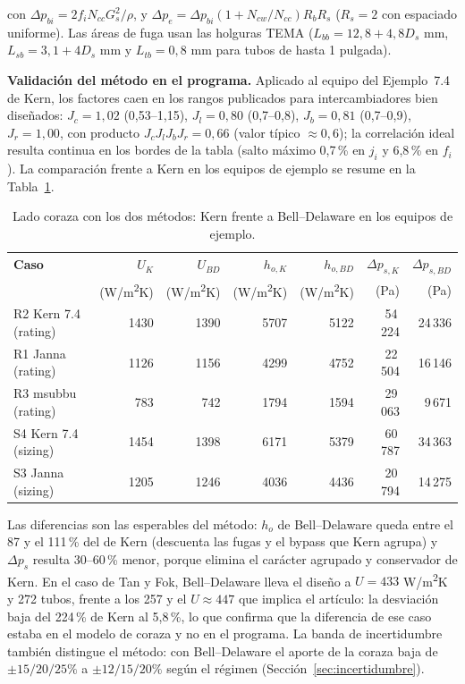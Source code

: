 \documentclass[11pt,a4paper]{article}
\begin{document}
con $\Delta p_{bi} = 2 f_i N_{cc} G_s^2/\rho$, 
y $\Delta p_e = \Delta p_{bi}(1+N_{cw}/N_{cc})R_bR_s$ 
($R_s = 2$ con espaciado uniforme). Las \'areas de fuga usan las 
holguras TEMA ($L_{bb} = 12{,}8+4{,}8D_s$ mm, $L_{sb} = 3{,}1+4D_s$ mm y 
$L_{tb} = 0{,}8$ mm para tubos de hasta 1 pulgada).

\textbf{Validaci\'on del m\'etodo en el programa.} Aplicado al equipo del 
Ejemplo~7.4 de Kern, los factores caen en los rangos publicados para 
intercambiadores bien dise\~nados: $J_c = 1{,}02$ (0,53--1,15), 
$J_l = 0{,}80$ (0,7--0,8), $J_b = 0{,}81$ (0,7--0,9), $J_r = 1{,}00$, con 
producto $J_cJ_lJ_bJ_r = 0{,}66$ (valor t\'ipico $\approx 0{,}6$); la 
correlaci\'on ideal resulta continua en los bordes de la tabla (salto 
m\'aximo 0,7\,\% en $j_i$ y 6,8\,\% en $f_i$). La comparaci\'on frente a Kern en los 
equipos de ejemplo se resume en la Tabla~\ref{tab:bd}.

\begin{table}[H]
\centering
\caption{Lado coraza con los dos m\'etodos: Kern frente a Bell--Delaware 
en los equipos de ejemplo.}
\label{tab:bd}
{\small
\begin{tabular}{@{}lrrrrrr@{}}
\toprule
\textbf{Caso} & $U_K$ & $U_{BD}$ & $h_{o,K}$ & $h_{o,BD}$ & $\Delta p_{s,K}$ & $\Delta p_{s,BD}$ \\
 & (W/m\textsuperscript{2}K) & (W/m\textsuperscript{2}K) & (W/m\textsuperscript{2}K) & (W/m\textsuperscript{2}K) & (Pa) & (Pa) \\
\midrule
R2 Kern 7.4 (rating) & 1430 & 1390 & 5707 & 5122 & 54\,224 & 24\,336 \\
R1 Janna (rating)    & 1126 & 1156 & 4299 & 4752 & 22\,504 & 16\,146 \\
R3 msubbu (rating)   & 783  & 742  & 1794 & 1594 & 29\,063 & 9\,671 \\
S4 Kern 7.4 (sizing) & 1454 & 1398 & 6171 & 5379 & 60\,787 & 34\,363 \\
S3 Janna (sizing)    & 1205 & 1246 & 4036 & 4436 & 20\,794 & 14\,275 \\
\bottomrule
\end{tabular}}
\end{table}

Las diferencias son las esperables del m\'etodo: $h_o$ de Bell--Delaware 
queda entre el 87 y el 111\,\% del de Kern (descuenta las fugas y el 
bypass que Kern agrupa) y $\Delta p_s$ resulta 30--60\,\% menor, porque 
elimina el car\'acter agrupado y conservador de Kern. En el caso de Tan y 
Fok, Bell--Delaware lleva el dise\~no a $U = 433$ W/m\textsuperscript{2}K 
y 272 tubos, frente a los 257 y el $U \approx 447$ que implica el 
art\'iculo: la desviaci\'on baja del 224\,\% de Kern al 
5,8\,\%, lo que confirma que la diferencia de ese caso estaba en 
el modelo de coraza y no en el programa. La banda de incertidumbre 
tambi\'en distingue el m\'etodo: con Bell--Delaware el aporte de la 
coraza baja de $\pm 15/20/25\%$ a $\pm 12/15/20\%$ seg\'un el 
r\'egimen (Secci\'on~\ref{sec:incertidumbre}).
\end{document}

